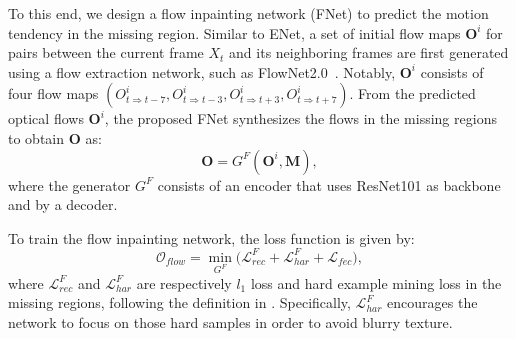 To this end, we design a flow inpainting network (FNet) to predict the motion tendency in the missing region.
%
Similar to ENet, a set of initial flow maps \(\boldsymbol{O}^i\) for pairs between the current frame $X_t$ and its neighboring frames are first generated using a flow extraction network, such as FlowNet2.0~\cite{Flownet_2017_CVPR}.
Notably, \(\boldsymbol{O}^i\) consists of four flow maps \((O^i_{t\Rightarrow t-7}, O^i_{t\Rightarrow t-3}, O^i_{t\Rightarrow t+3}, O^i_{t\Rightarrow t+7})\).
From the predicted optical flows $\boldsymbol{O}^i$, the proposed FNet synthesizes the flows in the missing regions to obtain \(\boldsymbol{O}\) as:
\begin{equation}
	\label{eq:flownet}
	\boldsymbol{O}=G^F(\boldsymbol{O}^{i},\boldsymbol{M}),
\end{equation}
where the generator $G^F$ consists of an encoder that uses ResNet101 \cite{He_2016_CVPR} as backbone and by a decoder.

To train the flow inpainting network, the loss function is given by:
\begin{equation}
	\label{eq:flow_all}
	\mathcal{O}_{flow}=\min\limits_{G^F} \big(\mathcal{L}^F_{rec}+ \mathcal{L}^F_{har}+\mathcal{L}_{fec}\big),
\end{equation}
where $\mathcal{L}^F_{rec}$ and $\mathcal{L}^F_{har}$ are respectively $l_1$ loss and hard example mining loss in the missing regions, following the definition in \cite{Xu_2019_CVPR}. 
Specifically, $\mathcal{L}^F_{har}$ encourages the network to focus on those hard samples in order to avoid blurry texture.




